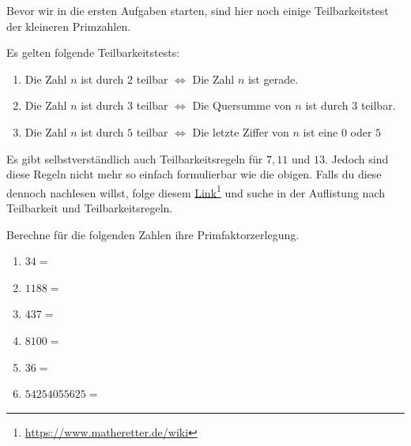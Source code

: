 \documentclass[11pt,oneside]{article}
\begin{document}
    Bevor wir in die ersten Aufgaben starten, sind hier noch einige Teilbarkeitstest der kleineren Primzahlen.
    \begin{satz}[Teilbarkeitstests]
        Es gelten folgende Teilbarkeitstests:
        \begin{enumerate}
            \item Die Zahl $n$ ist durch $2$ teilbar $\Leftrightarrow$ Die Zahl $n$ ist gerade.
            \item Die Zahl $n$ ist durch $3$ teilbar $\Leftrightarrow$ Die Quersumme von $n$ ist durch $3$ teilbar.
            \item Die Zahl $n$ ist durch $5$ teilbar $\Leftrightarrow$ Die letzte Ziffer von $n$ ist eine $0$ oder $5$
        \end{enumerate}
    \end{satz}
    Es gibt selbstverständlich auch Teilbarkeitsregeln für $7, 11$ und $13$. Jedoch sind diese Regeln nicht mehr so einfach formulierbar wie die obigen. Falls du diese dennoch nachlesen willst, folge diesem \href{https://www.matheretter.de/wiki}{Link}\footnote{\url{https://www.matheretter.de/wiki}} und suche in der Auflistung nach \glqq Teilbarkeit und Teilbarkeitsregeln\grqq.
    \begin{aufgabe}
        Berechne für die folgenden Zahlen ihre Primfaktorzerlegung.
        \begin{enumerate}[label=\alph*)]
            \item $34=$
            \item $1188=$
            \item $437=$
            \item $8100=$
            \item $36=$
            \item $54254055625=$
        \end{enumerate}
    \end{aufgabe}
\end{document}
